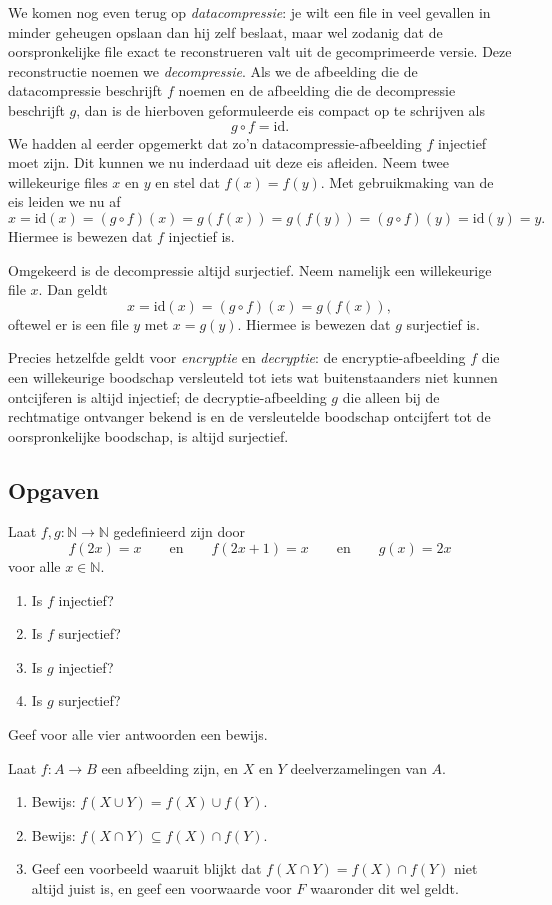 We komen nog even terug op \textit{datacompressie}: je wilt een file in veel gevallen in minder geheugen opslaan dan hij zelf beslaat, maar wel zodanig dat de oorspronkelijke file exact te reconstrueren valt uit de gecomprimeerde versie. Deze reconstructie noemen we \textit{decompressie}. Als we de afbeelding die de datacompressie beschrijft $f$ noemen en de afbeelding die de decompressie beschrijft $g$, dan is de hierboven geformuleerde eis compact op te schrijven als
$$g\circ f=\text{id}.$$
We hadden al eerder opgemerkt dat zo'n datacompressie-afbeelding $f$ injectief moet zijn. Dit kunnen we nu inderdaad uit deze eis afleiden. Neem twee willekeurige files $x$ en $y$ en stel dat $f(x)=f(y)$. Met gebruikmaking van de eis leiden we nu af
$$x=\text{id}(x)=(g\circ f)(x)=g(f(x))=g(f(y))=(g\circ f)(y)=\text{id}(y)=y.$$
Hiermee is bewezen dat $f$ injectief is.

Omgekeerd is de decompressie altijd surjectief. Neem namelijk een willekeurige file $x$. Dan geldt
$$x=\text{id}(x)=(g\circ f)(x)=g(f(x)),$$
oftewel er is een file $y$ met $x=g(y)$. Hiermee is bewezen dat $g$ surjectief is.

Precies hetzelfde geldt voor \textit{encryptie} en \textit{decryptie}: de encryptie-afbeelding $f$ die een willekeurige boodschap versleuteld tot iets wat buitenstaanders niet kunnen ontcijferen is altijd injectief; de decryptie-afbeelding $g$ die alleen bij de rechtmatige ontvanger bekend is en de versleutelde boodschap ontcijfert tot de oorspronkelijke boodschap, is altijd surjectief.

\subsection{Opgaven}
\begin{exercise}[Optioneel]
Laat $f,g:\mathbb{N}\rightarrow\mathbb{N}$ gedefinieerd zijn door
$$f(2x)=x\qquad\text{en}\qquad f(2x+1)=x\qquad\text{en}\qquad g(x)=2x$$
voor alle $x\in\mathbb{N}$.
\begin{enumerate}[label=\alph*.]
    \item Is $f$ injectief?
    \item Is $f$ surjectief?
    \item Is $g$ injectief?
    \item Is $g$ surjectief?
\end{enumerate}
Geef voor alle vier antwoorden een bewijs.
\end{exercise}

\begin{exercise}[Optioneel]
Laat $f:A\rightarrow B$ een afbeelding zijn, en $X$ en $Y$ deelverzamelingen van $A$.
\begin{enumerate}[label=\alph*.]
    \item Bewijs: $f(X\cup Y)=f(X)\cup f(Y)$.
    \item Bewijs: $f(X\cap Y)\subseteq f(X)\cap f(Y)$.
    \item Geef een voorbeeld waaruit blijkt dat $f(X\cap Y)=f(X)\cap f(Y)$ niet altijd juist is, en geef een voorwaarde voor $F$ waaronder dit wel geldt.
\end{enumerate}
\end{exercise}

